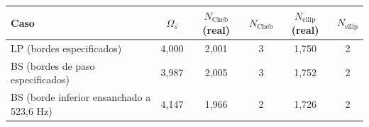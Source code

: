 \begin{tabular}{@{}lccccc@{}}
\toprule
Caso & $\Omega_s$ & $N_\mathrm{Cheb}$ (real) & $N_\mathrm{Cheb}$ & $N_\mathrm{ellip}$ (real) & $N_\mathrm{ellip}$ \\
\midrule
LP (bordes especificados) & 4{,}000 & 2{,}001 & 3 & 1{,}750 & 2 \\
BS (bordes de paso especificados) & 3{,}987 & 2{,}005 & 3 & 1{,}752 & 2 \\
BS (borde inferior ensanchado a 523,6 Hz) & 4{,}147 & 1{,}966 & 2 & 1{,}726 & 2 \\
\bottomrule
\end{tabular}